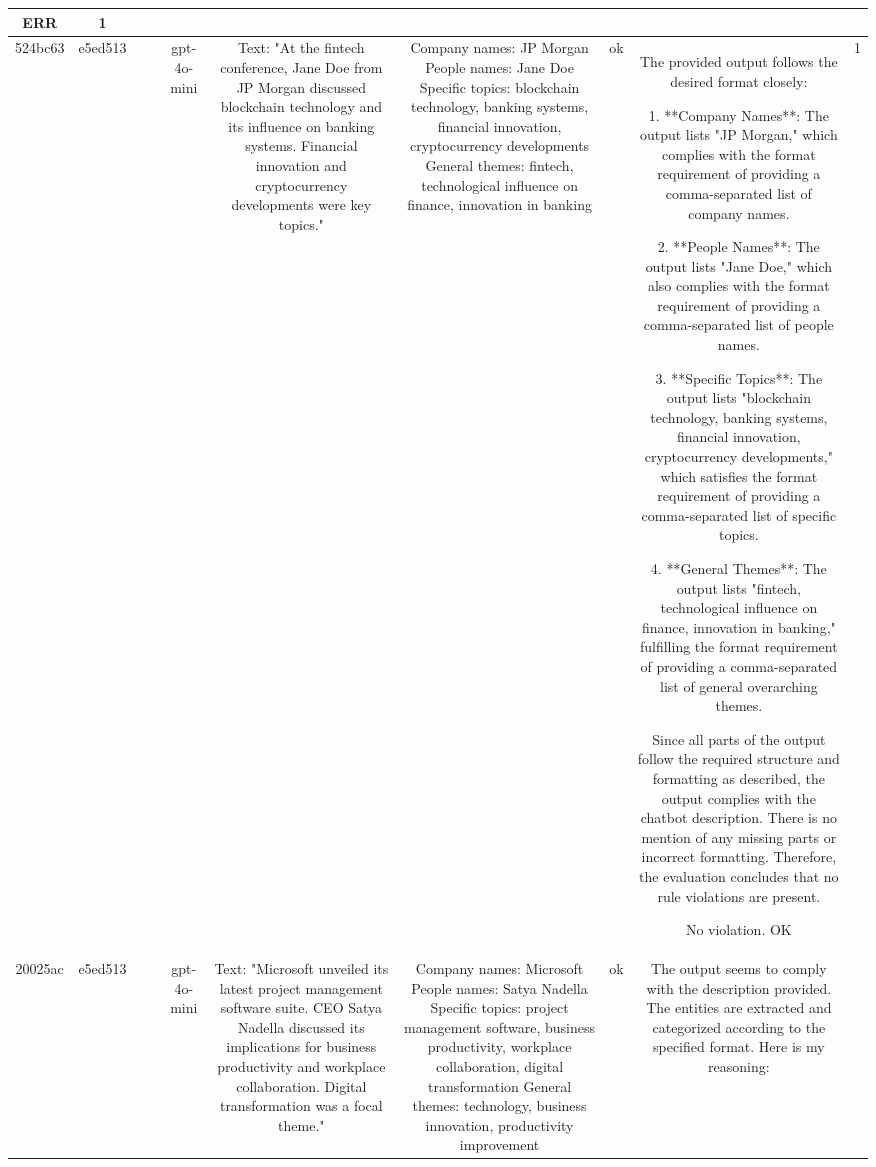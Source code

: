 \begin{table}[h!]
\begin{tabular}{|c|c|c|c|c|c|c|c|c|c|}
ERR & 1\\
\hline
524bc63 & e5ed513 &  &  & gpt-4o-mini & Text: "At the fintech conference, Jane Doe from JP Morgan discussed blockchain technology and its influence on banking systems. Financial innovation and cryptocurrency developments were key topics." & Company names: JP Morgan
People names: Jane Doe
Specific topics: blockchain technology, banking systems, financial innovation, cryptocurrency developments
General themes: fintech, technological influence on finance, innovation in banking & ok & The provided output follows the desired format closely:

1. **Company Names**: The output lists "JP Morgan," which complies with the format requirement of providing a comma-separated list of company names.

2. **People Names**: The output lists "Jane Doe," which also complies with the format requirement of providing a comma-separated list of people names.

3. **Specific Topics**: The output lists "blockchain technology, banking systems, financial innovation, cryptocurrency developments," which satisfies the format requirement of providing a comma-separated list of specific topics.

4. **General Themes**: The output lists "fintech, technological influence on finance, innovation in banking," fulfilling the format requirement of providing a comma-separated list of general overarching themes.

Since all parts of the output follow the required structure and formatting as described, the output complies with the chatbot description. There is no mention of any missing parts or incorrect formatting. Therefore, the evaluation concludes that no rule violations are present.

No violation.
OK & 1\\
\hline
20025ac & e5ed513 &  &  & gpt-4o-mini & Text: "Microsoft unveiled its latest project management software suite. CEO Satya Nadella discussed its implications for business productivity and workplace collaboration. Digital transformation was a focal theme." & Company names: Microsoft  
People names: Satya Nadella  
Specific topics: project management software, business productivity, workplace collaboration, digital transformation  
General themes: technology, business innovation, productivity improvement & ok & The output seems to comply with the description provided. The entities are extracted and categorized according to the specified format. Here is my reasoning:


\end{tabular}
\end{table}
